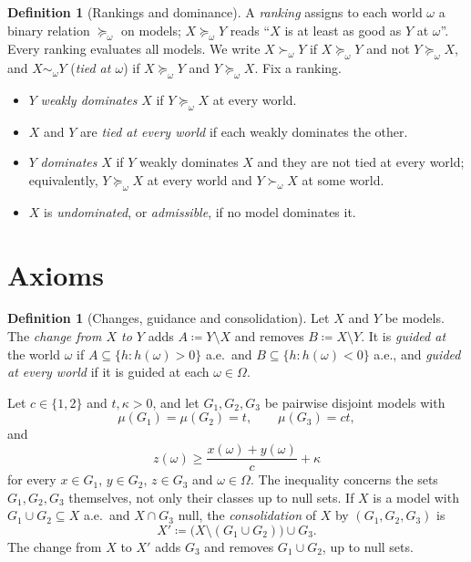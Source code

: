 \documentclass[11pt]{article}
\theoremstyle{definition}
\newtheorem{definition}[theorem]{Definition}
\begin{document}
\begin{definition}[Rankings and dominance]\label{def:rankings}
A \emph{ranking} assigns to each world $\omega$ a binary relation $\succeq_\omega$ on models; $X\succeq_\omega Y$ reads ``$X$ is at least as good as $Y$ at $\omega$''. Every ranking evaluates all models. We write $X\succ_\omega Y$ if $X\succeq_\omega Y$ and not $Y\succeq_\omega X$, and $X\sim_\omega Y$ (\emph{tied at $\omega$}) if $X\succeq_\omega Y$ and $Y\succeq_\omega X$. Fix a ranking.
\begin{itemize}[leftmargin=*]
\item $Y$ \emph{weakly dominates} $X$ if $Y\succeq_\omega X$ at every world.
\item $X$ and $Y$ are \emph{tied at every world} if each weakly dominates the other.
\item $Y$ \emph{dominates} $X$ if $Y$ weakly dominates $X$ and they are not tied at every world; equivalently, $Y\succeq_\omega X$ at every world and $Y\succ_\omega X$ at some world.
\item $X$ is \emph{undominated}, or \emph{admissible}, if no model dominates it.
\end{itemize}
\end{definition}

\section{Axioms}\label{sec:axioms}

\begin{definition}[Changes, guidance and consolidation]\label{def:change}
Let $X$ and $Y$ be models. The \emph{change from $X$ to $Y$} adds $A\coloneqq Y\setminus X$ and removes $B\coloneqq X\setminus Y$. It is \emph{guided at} the world $\omega$ if $A\subseteq\{h:h(\omega)>0\}$ a.e.\ and $B\subseteq\{h:h(\omega)<0\}$ a.e., and \emph{guided at every world} if it is guided at each $\omega\in\Omega$.

Let $c\in\{1,2\}$ and $t,\kappa>0$, and let $G_1,G_2,G_3$ be pairwise disjoint models with
\[
\mu(G_1)=\mu(G_2)=t,\qquad\mu(G_3)=ct,
\]
and
\[
z(\omega)\ge\frac{x(\omega)+y(\omega)}c+\kappa
\]
for every $x\in G_1$, $y\in G_2$, $z\in G_3$ and $\omega\in\Omega$. The inequality concerns the sets $G_1,G_2,G_3$ themselves, not only their classes up to null sets. If $X$ is a model with $G_1\cup G_2\subseteq X$ a.e.\ and $X\cap G_3$ null, the \emph{consolidation} of $X$ by $(G_1,G_2,G_3)$ is
\[
X'\coloneqq\bigl(X\setminus(G_1\cup G_2)\bigr)\cup G_3 .
\]
The change from $X$ to $X'$ adds $G_3$ and removes $G_1\cup G_2$, up to null sets.
\end{definition}
\end{document}
